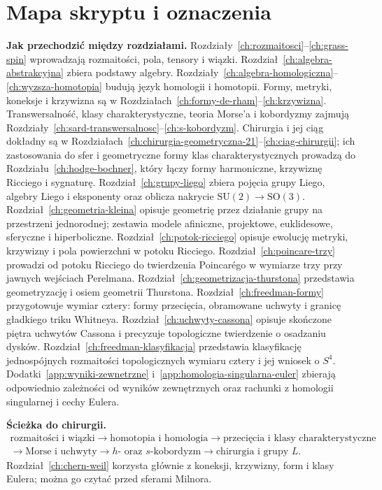 \begingroup
\footnotesize\linespread{0.90}\selectfont
\setlength{\parskip}{0pt}\tableofcontents
\endgroup
\clearpage
\chapter*{Mapa skryptu i oznaczenia}

\noindent\textbf{Jak przechodzić między rozdziałami.}
Rozdziały~\ref{ch:rozmaitosci}--\ref{ch:grass-spin}
wprowadzają rozmaitości, pola, tensory i wiązki.
Rozdział~\ref{ch:algebra-abstrakcyjna} zbiera podstawy algebry.
Rozdziały~\ref{ch:algebra-homologiczna}--\ref{ch:wyzsza-homotopia}
budują język homologii i homotopii.
Formy, metryki, koneksje i krzywizna są w
Rozdziałach~\ref{ch:formy-de-rham}--\ref{ch:krzywizna}.
Transwersalność, klasy charakterystyczne,
teoria Morse'a i kobordyzmy zajmują
Rozdziały~\ref{ch:sard-transwersalnosc}--\ref{ch:s-kobordyzm}.
Chirurgia i jej ciąg dokładny są w
Rozdziałach~\ref{ch:chirurgia-geometryczna-21}--\ref{ch:ciag-chirurgii};
ich zastosowania do sfer i geometryczne
formy klas charakterystycznych prowadzą do
Rozdziału~\ref{ch:hodge-bochner}, który łączy
formy harmoniczne, krzywiznę Ricciego i sygnaturę.
Rozdział~\ref{ch:grupy-liego} zbiera pojęcia grupy Liego,
algebry Liego i eksponenty oraz oblicza nakrycie
$\mathrm{SU}(2)\to\mathrm{SO}(3)$.
Rozdział~\ref{ch:geometria-kleina} opisuje geometrię przez
działanie grupy na przestrzeni jednorodnej; zestawia modele
afiniczne, projektowe, euklidesowe, sferyczne i hiperboliczne.
Rozdział~\ref{ch:potok-ricciego} opisuje ewolucję metryki,
krzywizny i pola powierzchni w potoku Ricciego.
Rozdział~\ref{ch:poincare-trzy} prowadzi od potoku Ricciego
do twierdzenia Poincarégo w wymiarze trzy przy jawnych
wejściach Perelmana. Rozdział~\ref{ch:geometrizacja-thurstona}
przedstawia geometryzację i osiem geometrii Thurstona.
Rozdział~\ref{ch:freedman-formy} przygotowuje wymiar cztery:
formy przecięcia, obramowane uchwyty i granicę gładkiego
triku Whitneya.
Rozdział~\ref{ch:uchwyty-cassona} opisuje skończone piętra
uchwytów Cassona i precyzuje topologiczne twierdzenie
o osadzaniu dysków. Rozdział~\ref{ch:freedman-klasyfikacja}
przedstawia klasyfikację jednospójnych rozmaitości
topologicznych wymiaru cztery i jej wniosek o $S^4$.
Dodatki~\ref{app:wyniki-zewnetrzne} i~\ref{app:homologia-singularna-euler}
zbierają odpowiednio zależności od wyników zewnętrznych
oraz rachunki z homologii singularnej i cechy Eulera.

\noindent\textbf{Ścieżka do chirurgii.}
\[
\begin{gathered}
\text{rozmaitości i wiązki}
\longrightarrow \text{homotopia i homologia}
\longrightarrow \text{przecięcia i klasy charakterystyczne}\\
\longrightarrow \text{Morse i uchwyty}
\longrightarrow h\text{- oraz }s\text{-kobordyzm}
\longrightarrow \text{chirurgia i grupy }L.
\end{gathered}
\]
Rozdział~\ref{ch:chern-weil} korzysta głównie
z koneksji, krzywizny, form i klasy Eulera;
można go czytać przed sferami Milnora.

